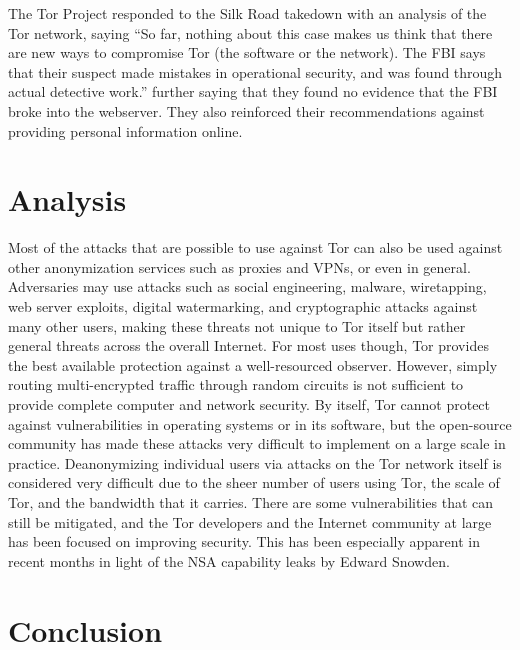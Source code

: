 \documentclass[journal]{IEEEtran}
\begin{document}
The Tor Project responded to the Silk Road takedown with an analysis of the Tor network, saying ``So far, nothing about this case makes us think that there are new ways to compromise Tor (the software or the network). The FBI says that their suspect made mistakes in operational security, and was found through actual detective work.'' further saying that they found no evidence that the FBI broke into the webserver. They also reinforced their recommendations against providing personal information online.\cite{TorBlogSilkRoad}

\section{Analysis}

Most of the attacks that are possible to use against Tor can also be used against other anonymization services such as proxies and VPNs, or even in general. Adversaries may use attacks such as social engineering, malware, wiretapping, web server exploits, digital watermarking, and cryptographic attacks against many other users, making these threats not unique to Tor itself but rather general threats across the overall Internet. For most uses though, Tor provides the best available protection against a well-resourced observer. However, simply routing multi-encrypted traffic through random circuits is not sufficient to provide complete computer and network security. By itself, Tor cannot protect against vulnerabilities in operating systems or in its software, but the open-source community has made these attacks very difficult to implement on a large scale in practice. Deanonymizing individual users via attacks on the Tor network itself is considered very difficult due to the sheer number of users using Tor, the scale of Tor, and the bandwidth that it carries. There are some vulnerabilities that can still be mitigated, and the Tor developers and the Internet community at large has been focused on improving security. This has been especially apparent in recent months in light of the NSA capability leaks by Edward Snowden.

\section{Conclusion}
\end{document}
